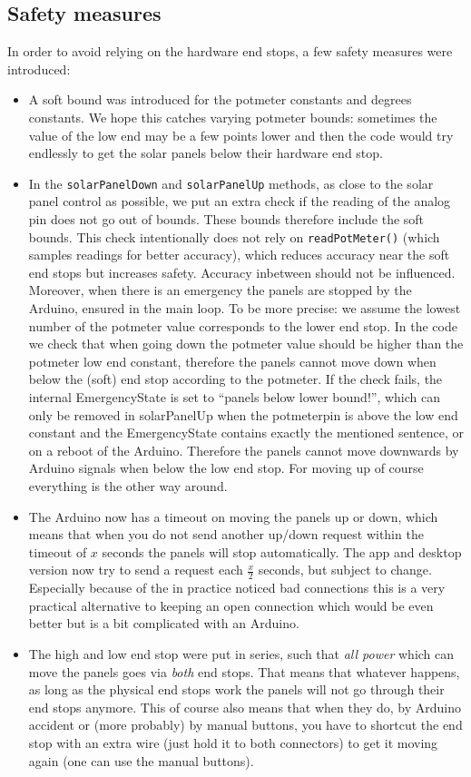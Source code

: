 \subsection{Safety measures}\label{subsec:safetyMeasures}
    In order to avoid relying on the hardware end stops, a few safety measures were introduced:
    \begin{itemize}
        \item A soft bound was introduced for the potmeter constants and degrees constants.
        We hope this catches varying potmeter bounds: sometimes the value of the low end may be a few points lower and then the code would try endlessly to get the solar panels below their hardware end stop.
        \item In the \verb|solarPanelDown| and \verb|solarPanelUp| methods, as close to the solar panel control as possible, we put an extra check if the reading of the analog pin does not go out of bounds.
        These bounds therefore include the soft bounds.
        This check intentionally does not rely on \verb|readPotMeter()| (which samples readings for better accuracy), which reduces accuracy near the soft end stops but increases safety.
        Accuracy inbetween should not be influenced.
        Moreover, when there is an emergency the panels are stopped by the Arduino, ensured in the main loop.
        To be more precise: we assume the lowest number of the potmeter value corresponds to the lower end stop.
        In the code we check that when going down the potmeter value should be higher than the potmeter low end constant, therefore the panels cannot move down when below the (soft) end stop according to the potmeter.
        If the check fails, the internal EmergencyState is set to ``panels below lower bound!'', which can only be removed in solarPanelUp when the potmeterpin is above the low end constant and the EmergencyState contains exactly the mentioned sentence, or on a reboot of the Arduino.
        Therefore the panels cannot move downwards by Arduino signals when below the low end stop.
        For moving up of course everything is the other way around.
        \item The Arduino now has a timeout on moving the panels up or down, which means that when you do not send another up/down request within the timeout of $x$ seconds the panels will stop automatically.
        The app and desktop version now try to send a request each $\frac{x}{2}$ seconds, but subject to change.
        Especially because of the in practice noticed bad connections this is a very practical alternative to keeping an open connection which would be even better but is a bit complicated with an Arduino.
        \item The high and low end stop were put in series, such that \textit{all power} which can move the panels goes via \textit{both} end stops.
        That means that whatever happens, as long as the physical end stops work the panels will not go through their end stops anymore.
        This of course also means that when they do, by Arduino accident or (more probably) by manual buttons, you have to shortcut the end stop with an extra wire (just hold it to both connectors) to get it moving again (one can use the manual buttons).
    \end{itemize}